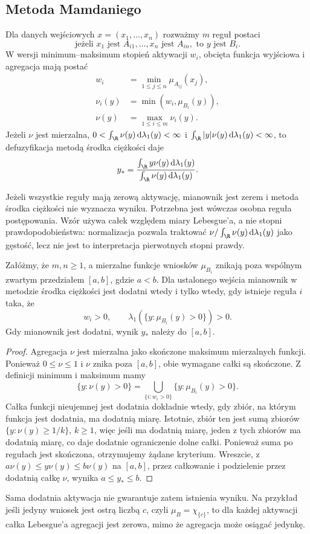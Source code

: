 \subsection{Metoda Mamdaniego}
\begin{definicja}\label{def:lst-fuzzy-mamdani}
Dla danych wejściowych $x=(x_1,\ldots,x_n)$ rozważmy
$m$ reguł postaci
\[
 \text{jeżeli }x_1\text{ jest }A_{i1},\ldots,
 x_n\text{ jest }A_{in},\text{ to }y\text{ jest }B_i.
\]
W wersji minimum--maksimum stopień aktywacji $w_i$,
obcięta funkcja wyjściowa i agregacja mają postać
\[
\begin{split}
 w_i&=\min_{1\leq j\leq n}\mu_{A_{ij}}(x_j),\\
 \nu_i(y)&=\min(w_i,\mu_{B_i}(y)),\\
 \nu(y)&=\max_{1\leq i\leq m}\nu_i(y).
\end{split}
\]
Jeżeli $\nu$ jest mierzalna,
$0<\int_\R\nu(y)\,\mathrm d\lambda_1(y)<\infty$ i
$\int_\R |y|\nu(y)\,\mathrm d\lambda_1(y)<\infty$, to
defuzyfikacja metodą środka ciężkości daje
\[
 y_*=\frac{\int_\R y\nu(y)\,\mathrm d\lambda_1(y)}
 {\int_\R\nu(y)\,\mathrm d\lambda_1(y)}.
\]
\end{definicja}
Jeżeli wszystkie reguły mają zerową aktywację, mianownik
jest zerem i metoda środka ciężkości nie wyznacza wyniku.
Potrzebna jest wówczas osobna reguła postępowania.
Wzór używa całek względem miary Lebesgue'a, a nie stopni
prawdopodobieństwa: normalizacja pozwala traktować
$\nu/\int_\R\nu(y)\,\mathrm d\lambda_1(y)$ jako gęstość,
lecz nie jest to interpretacja pierwotnych stopni prawdy.

\begin{stwierdzenie}
\label{prop:ncl-mamdani-existence}
Załóżmy, że $m,n\geq1$, a mierzalne funkcje wniosków
$\mu_{B_i}$ znikają poza wspólnym zwartym przedziałem
$[a,b]$, gdzie $a<b$. Dla ustalonego wejścia
mianownik w metodzie środka ciężkości jest dodatni
wtedy i tylko wtedy, gdy istnieje reguła $i$ taka, że
\[
 w_i>0,\qquad
 \lambda_1(\{y:\mu_{B_i}(y)>0\})>0.
\]
Gdy mianownik jest dodatni, wynik $y_*$ należy do $[a,b]$.
\end{stwierdzenie}
\begin{proof}
Agregacja $\nu$ jest mierzalna jako skończone maksimum
mierzalnych funkcji. Ponieważ $0\leq\nu\leq1$ i $\nu$
znika poza $[a,b]$, obie wymagane całki są skończone.
Z definicji minimum i maksimum mamy
\[
 \{y:\nu(y)>0\}
 =\bigcup_{\{i:w_i>0\}}\{y:\mu_{B_i}(y)>0\}.
\]
Całka funkcji nieujemnej jest dodatnia dokładnie wtedy,
gdy zbiór, na którym funkcja jest dodatnia, ma dodatnią
miarę. Istotnie, zbiór ten jest sumą zbiorów
$\{y:\nu(y)\geq1/k\}$, $k\geq1$, więc jeśli ma
dodatnią miarę, jeden z tych zbiorów ma dodatnią miarę,
co daje dodatnie ograniczenie dolne całki.
Ponieważ suma po regułach jest skończona,
otrzymujemy żądane kryterium.
Wreszcie, z $a\nu(y)\leq y\nu(y)\leq b\nu(y)$
na $[a,b]$, przez całkowanie i podzielenie przez
dodatnią całkę $\nu$, wynika $a\leq y_*\leq b$.
\end{proof}
Sama dodatnia aktywacja nie gwarantuje zatem
istnienia wyniku. Na przykład jeśli jedyny wniosek
jest ostrą liczbą $c$, czyli $\mu_B=\chi_{\{c\}}$,
to dla każdej aktywacji całka Lebesgue'a agregacji
jest zerowa, mimo że agregacja może osiągać jedynkę.

